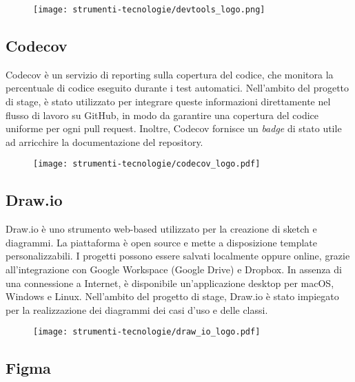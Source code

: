 \begin{figure}[H]
    \centering 
    \texttt{[image: strumenti-tecnologie/devtools\_logo.png]} 
\end{figure}

\subsection*{Codecov}

\par Codecov è un servizio di reporting sulla copertura del codice, che monitora la percentuale di codice eseguito durante i test automatici. Nell’ambito del progetto di stage, è stato utilizzato per integrare queste informazioni direttamente nel flusso di lavoro su GitHub, in modo da garantire una copertura del codice uniforme per ogni pull request. Inoltre, Codecov fornisce un \textit{badge} di stato utile ad arricchire la documentazione del repository.

\begin{figure}[H]
    \centering 
    \texttt{[image: strumenti-tecnologie/codecov\_logo.pdf]} 
\end{figure}

\subsection*{Draw.io}

\par Draw.io è uno strumento web-based utilizzato per la creazione di sketch e diagrammi. La piattaforma è open source e mette a disposizione template personalizzabili. I progetti possono essere salvati localmente oppure online, grazie all’integrazione con Google Workspace (Google Drive) e Dropbox. In assenza di una connessione a Internet, è disponibile un'applicazione desktop per macOS, Windows e Linux. Nell’ambito del progetto di stage, Draw.io è stato impiegato per la realizzazione dei diagrammi dei casi d’uso e delle classi.

\begin{figure}[H]
    \centering 
    \texttt{[image: strumenti-tecnologie/draw\_io\_logo.pdf]} 
\end{figure}

\subsection*{Figma}

